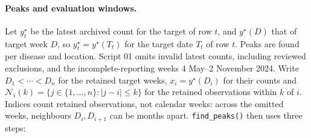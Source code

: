 \documentclass[11pt,a4paper]{article}
\theoremstyle{definition}
\theoremstyle{remark}
\begin{document}
\paragraph{Peaks and evaluation windows.}
Let $y_t^\star$ be the latest archived count for the target of row $t$,
and $y^\star(D)$ that of target week $D$, so $y_t^\star=y^\star(T_t)$ for
the target date $T_t$ of row $t$. Peaks are found per disease and location. Script 01 omits invalid latest counts, including reviewed
exclusions, and the incomplete-reporting weeks 4 May--2 November 2024.
Write $D_1<\cdots<D_n$ for the retained target weeks, $x_i=y^\star(D_i)$
for their counts and
$\mathcal N_i(k)=\{j\in\{1,\ldots,n\}:|j-i|\le k\}$ for the retained
observations within $k$ of $i$. Indices count retained observations, not
calendar weeks: across the omitted weeks, neighbours $D_i,D_{i+1}$ can be
months apart. \texttt{find\_peaks()} then uses three steps:
\end{document}
